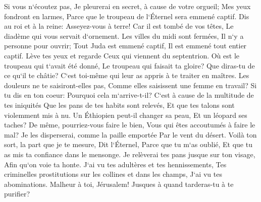 \verse Si vous n`écoutez pas, Je pleurerai en secret, à cause de votre orgueil; Mes yeux fondront en larmes, Parce que le troupeau de l`Éternel sera emmené captif. 
\verse Dis au roi et à la reine: Asseyez-vous à terre! Car il est tombé de vos têtes, Le diadème qui vous servait d`ornement. 
\verse Les villes du midi sont fermées, Il n`y a personne pour ouvrir; Tout Juda est emmené captif, Il est emmené tout entier captif. 
\verse Lève tes yeux et regarde Ceux qui viennent du septentrion. Où est le troupeau qui t`avait été donné, Le troupeau qui faisait ta gloire? 
\verse Que diras-tu de ce qu`il te châtie? C`est toi-même qui leur as appris à te traiter en maîtres. Les douleurs ne te saisiront-elles pas, Comme elles saisissent une femme en travail? 
\verse Si tu dis en ton coeur: Pourquoi cela m`arrive-t-il? C`est à cause de la multitude de tes iniquités Que les pans de tes habits sont relevés, Et que tes talons sont violemment mis à nu. 
\verse Un Éthiopien peut-il changer sa peau, Et un léopard ses taches? De même, pourriez-vous faire le bien, Vous qui êtes accoutumés à faire le mal? 
\verse Je les disperserai, comme la paille emportée Par le vent du désert. 
\verse Voilà ton sort, la part que je te mesure, Dit l`Éternel, Parce que tu m`as oublié, Et que tu as mis ta confiance dans le mensonge. 
\verse Je relèverai tes pans jusque sur ton visage, Afin qu`on voie ta honte. 
\verse J`ai vu tes adultères et tes hennissements, Tes criminelles prostitutions sur les collines et dans les champs, J`ai vu tes abominations. Malheur à toi, Jérusalem! Jusques à quand tarderas-tu à te purifier? 

